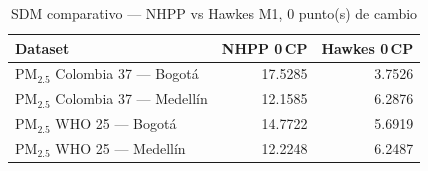 \begin{table}[htbp]
\centering
\caption{SDM comparativo --- NHPP vs Hawkes M1, 0 punto(s) de cambio}
\label{tab:comp_sdm_0cp}
\begin{tabular}{lrr}
\toprule
Dataset & NHPP 0\,CP & Hawkes 0\,CP \\
\midrule
PM$_{2.5}$ Colombia 37 --- Bogot\'{a} & 17.5285 & 3.7526 \\
PM$_{2.5}$ Colombia 37 --- Medell\'{i}n & 12.1585 & 6.2876 \\
PM$_{2.5}$ WHO 25 --- Bogot\'{a} & 14.7722 & 5.6919 \\
PM$_{2.5}$ WHO 25 --- Medell\'{i}n & 12.2248 & 6.2487 \\
\bottomrule
\end{tabular}
\end{table}
